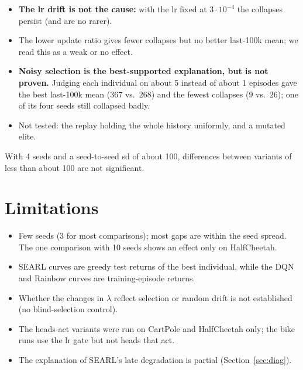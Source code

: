 \documentclass[11pt]{article}
\begin{document}
\begin{itemize}
  \item \textbf{The lr drift is not the cause:} with the lr fixed at $3\cdot10^{-4}$ the collapses persist (and are no rarer).
  \item The lower update ratio gives fewer collapses but no better last-100k mean; we read this as a weak or no effect.
  \item \textbf{Noisy selection is the best-supported explanation, but is not proven.} Judging each individual on about 5 instead of
        about 1 episodes gave the best last-100k mean ($367$ vs.\ $268$) and the fewest collapses ($9$ vs.\ $26$); one of its
        four seeds still collapsed badly.
  \item Not tested: the replay holding the whole history uniformly, and a mutated elite.
\end{itemize}
With 4 seeds and a seed-to-seed sd of about 100, differences between variants of less than about 100 are not significant.

\section{Limitations}
\begin{itemize}
  \item Few seeds (3 for most comparisons); most gaps are within the seed spread. The one comparison with 10 seeds shows an
        effect only on HalfCheetah.
  \item SEARL curves are greedy test returns of the best individual, while the DQN and Rainbow curves are training-episode returns.
  \item Whether the changes in $\lambda$ reflect selection or random drift is not established (no blind-selection control).
  \item The heads-act variants were run on CartPole and HalfCheetah only; the bike runs use the lr gate but not heads that act.
  \item The explanation of SEARL's late degradation is partial (Section~\ref{sec:diag}).
\end{itemize}
\end{document}
